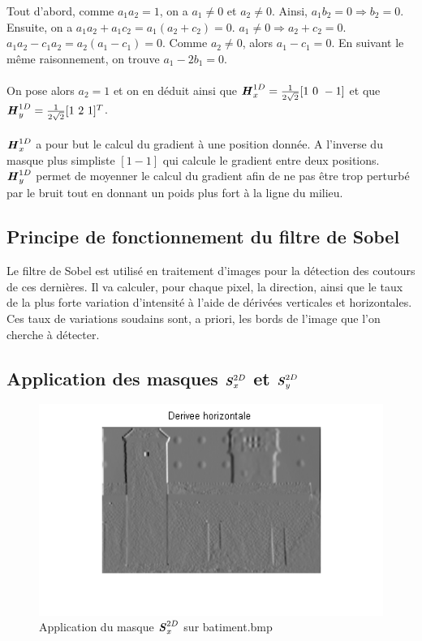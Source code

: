 \documentclass[11pt]{article}
\begin{document}
		Tout d'abord, comme $a_1a_2 = 1$, on a $a_1 \neq 0$ et $a_2 \neq 0$. Ainsi, $a_1b_2 = 0 \Rightarrow b_2 = 0$.\\
		Ensuite, on a $a_1a_2 + a_1c_2 = a_1(a_2+c_2) = 0$. $a_1 \neq 0 \Rightarrow a_2 + c_2 = 0$.\\
		$a_1a_2 - c_1a_2 = a_2(a_1-c_1) = 0$. Comme $a_2 \neq 0$, alors $a_1 - c_1 = 0$. En suivant le même raisonnement, on trouve $a_1-2b_1 = 0$.\\
		\\
		On pose alors $a_2 = 1$ et on en déduit ainsi que $\textbf{\textit{H}}_x^{1D} = \frac{1}{2\sqrt{2}}[1\ 0\ -1]$ et que $\textbf{\textit{H}}_y^{1D} = \frac{1}{2\sqrt{2}}[1\ 2\ 1]^T$.\\
		\\
		$\textbf{\textit{H}}_x^{1D}$ a pour but le calcul du gradient à une position donnée. A l'inverse du masque plus simpliste $[1 -1]$ qui calcule le gradient entre deux positions.\\
		$\textbf{\textit{H}}_y^{1D}$ permet de moyenner le calcul du gradient afin de ne pas être trop perturbé par le bruit tout en donnant un poids plus fort à la ligne du milieu.\\
	
	\subsection{Principe de fonctionnement du filtre de Sobel}
	
		Le filtre de Sobel est utilisé en traitement d'images pour la détection des coutours de ces dernières. Il va calculer, pour chaque pixel, la direction, ainsi que le taux de la plus forte variation d'intensité à l'aide de dérivées verticales et horizontales. Ces taux de variations soudains sont, a priori, les bords de l'image que l'on cherche à détecter.
	
	\newpage
	
	\subsection{Application des masques $\textbf{\textit{S}}_x^{2D}$ et $\textbf{\textit{S}}_y^{2D}$}
	
		\begin{figure}[h]
			\centering
			\includegraphics[scale=1]{img/derivee_horizontale.png}
			\caption{Application du masque $\textbf{\textit{S}}_x^{2D}$ sur batiment.bmp}
			\label{img1}
		\end{figure}
	
\end{document}
